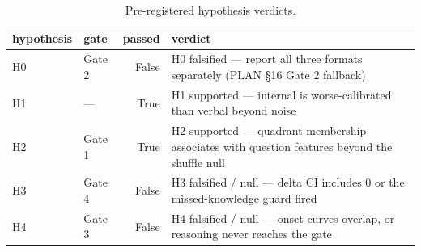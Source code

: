 \begin{table}
\caption{Pre-registered hypothesis verdicts.}
\label{tab:t15_hypothesis_verdicts}
\begin{tabular}{llrl}
\toprule
hypothesis & gate & passed & verdict \\
\midrule
H0 & Gate 2 & False & H0 falsified — report all three formats separately (PLAN §16 Gate 2 fallback) \\
H1 & — & True & H1 supported — internal is worse-calibrated than verbal beyond noise \\
H2 & Gate 1 & True & H2 supported — quadrant membership associates with question features beyond the shuffle null \\
H3 & Gate 4 & False & H3 falsified / null — delta CI includes 0 or the missed-knowledge guard fired \\
H4 & Gate 3 & False & H4 falsified / null — onset curves overlap, or reasoning never reaches the gate \\
\bottomrule
\end{tabular}
\end{table}
